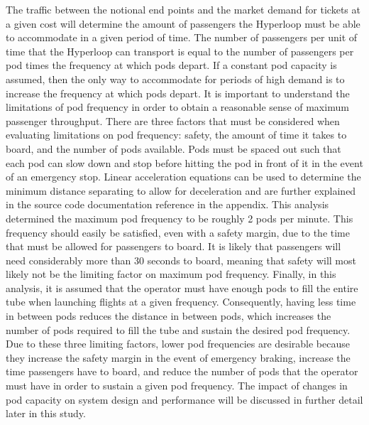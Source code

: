 The traffic between the notional end points and the market demand for tickets
at a given cost will determine the amount of passengers the Hyperloop must be
able to accommodate in a given period of time. The number of passengers per
unit of time that the Hyperloop can transport is equal to the number of
passengers per pod times the frequency at which pods depart. If a constant pod
capacity is assumed, then the only way to accommodate for periods of high
demand is to increase the frequency at which pods depart. It is important to
understand the limitations of pod frequency in order to obtain a reasonable
sense of maximum passenger throughput. There are three factors that must be
considered when evaluating limitations on pod frequency: safety, the amount of
time it takes to board, and the number of pods available. Pods must be spaced
out such that each pod can slow down and stop before hitting the pod in front
of it in the event of an emergency stop. Linear acceleration equations can be
used to determine the minimum distance separating to allow for deceleration
and are further explained in the source code documentation reference in the appendix.
This analysis determined the maximum pod frequency to be
roughly 2 pods per minute. This frequency should easily be satisfied, even
with a safety margin, due to the time that must be allowed for passengers to
board. It is likely that passengers will need considerably more than 30
seconds to board, meaning that safety will most likely not be the limiting factor on
maximum pod frequency. Finally, in this analysis, it is assumed that the
operator must have enough pods to fill the entire tube when launching flights
at a given frequency. Consequently, having less time in between pods reduces
the distance in between pods, which increases the number of pods required to
fill the tube and sustain the desired pod frequency. Due to these three
limiting factors, lower pod frequencies are desirable because they increase
the safety margin in the event of emergency braking, increase the time
passengers have to board, and reduce the number of pods that the operator must
have in order to sustain a given pod frequency. The impact of changes in pod
capacity on system design and performance will be discussed in further detail
later in this study.

